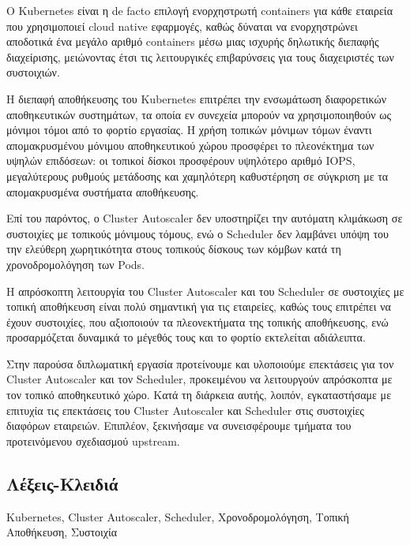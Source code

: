\grabstract
{}
\vspace{-0.5cm}
Ο Kubernetes είναι η de facto επιλογή ενορχηστρωτή containers για κάθε εταιρεία
που χρησιμοποιεί cloud native εφαρμογές, καθώς δύναται να
ενορχηστρώνει αποδοτικά ένα μεγάλο αριθμό containers μέσω μιας ισχυρής
δηλωτικής διεπαφής διαχείρισης, μειώνοντας έτσι τις λειτουργικές επιβαρύνσεις
για τους διαχειριστές των συστοιχιών.

Η διεπαφή αποθήκευσης του Kubernetes επιτρέπει την ενσωμάτωση διαφορετικών
αποθηκευτικών συστημάτων, τα οποία εν συνεχεία μπορούν να χρησιμοποιηθούν ως
μόνιμοι τόμοι από το φορτίο εργασίας.  Η χρήση τοπικών μόνιμων τόμων έναντι
απομακρυσμένου μόνιμου αποθηκευτικού χώρου προσφέρει το πλεονέκτημα των υψηλών
επιδόσεων: οι τοπικοί δίσκοι προσφέρουν υψηλότερο αριθμό IOPS, μεγαλύτερους
ρυθμούς μετάδοσης και χαμηλότερη καθυστέρηση σε σύγκριση με τα απομακρυσμένα
συστήματα αποθήκευσης.

Επί του παρόντος, ο Cluster Autoscaler δεν υποστηρίζει την αυτόματη κλιμάκωση σε
συστοιχίες με τοπικούς μόνιμους τόμους, ενώ ο Scheduler δεν λαμβάνει υπόψη του
την ελεύθερη χωρητικότητα στους τοπικούς δίσκους των κόμβων κατά τη
χρονοδρομολόγηση των Pods.

Η απρόσκοπτη λειτουργία του Cluster Autoscaler και του Scheduler σε συστοιχίες
 με τοπική αποθήκευση είναι πολύ σημαντική για τις εταιρείες,
καθώς τους επιτρέπει να έχουν συστοιχίες, που αξιοποιούν τα πλεονεκτήματα της
τοπικής αποθήκευσης, ενώ προσαρμόζεται δυναμικά το μέγεθός τους και το φορτίο
εκτελείται αδιάλειπτα.

Στην παρούσα διπλωματική εργασία προτείνουμε και υλοποιούμε επεκτάσεις για τον
Cluster Autoscaler και τον Scheduler, προκειμένου να λειτουργούν απρόσκοπτα με
τον τοπικό αποθηκευτικό χώρο. Κατά τη διάρκεια αυτής, λοιπόν, εγκαταστήσαμε με
επιτυχία τις επεκτάσεις του Cluster Autoscaler και Scheduler στις συστοιχίες
διαφόρων εταιρειών. Επιπλέον, ξεκινήσαμε να συνεισφέρουμε τμήματα του
προτεινόμενου σχεδιασμού upstream.

\subsection*{Λέξεις-Κλειδιά}
Kubernetes, Cluster Autoscaler, Scheduler, Χρονοδρομολόγηση, Τοπική Αποθήκευση,
Συστοιχία
